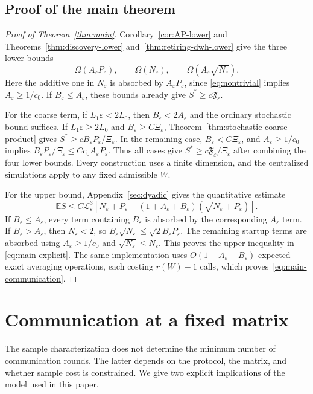 \documentclass[11pt,a4paper]{article}
\newcommand{\E}{\mathbb{E}}
\newcommand{\eps}{\varepsilon}
\theoremstyle{remark}
\begin{document}
\subsection{Proof of the main theorem}
\label{sec:assembly}

\begin{proof}[Proof of Theorem~\ref{thm:main}]
Corollary~\ref{cor:AP-lower} and Theorems~\ref{thm:discovery-lower}
and~\ref{thm:retiring-dwh-lower} give the three lower bounds
\[
 \Omega(A_\eps P_\eps),\qquad \Omega(N_\eps),\qquad
 \Omega(A_\eps\sqrt{N_\eps}).
\]
Here the additive one in $N_\eps$ is absorbed by $A_\eps P_\eps$, since
\eqref{eq:nontrivial} implies $A_\eps\ge1/c_0$.
If $B_\eps\le A_\eps$, these bounds already give
$S^*\ge c\mathfrak F_\eps$.

For the coarse term, if $L_1\eps<2L_0$, then $B_\eps<2A_\eps$ and the
ordinary stochastic bound suffices. If $L_1\eps\ge2L_0$ and
$B_\eps\ge C\Xi_\eps$, Theorem~\ref{thm:stochastic-coarse-product} gives
$S^*\ge cB_\eps P_\eps/\Xi_\eps$. In the remaining case,
$B_\eps<C\Xi_\eps$, and $A_\eps\ge1/c_0$ implies
$B_\eps P_\eps/\Xi_\eps\le Cc_0A_\eps P_\eps$.
Thus all cases give $S^*\ge c\mathfrak F_\eps/\Xi_\eps$ after combining
the four lower bounds. Every construction uses a finite dimension, and the
centralized simulations apply to any fixed admissible $W$.

For the upper bound, Appendix~\ref{sec:dyadic} gives the quantitative estimate
\[
 \E S\le C\mathcal L_\eps^3
 \left[N_\eps+P_\eps+
       (1+A_\eps+B_\eps)(\sqrt{N_\eps}+P_\eps)\right].
\]
If $B_\eps\le A_\eps$, every term containing $B_\eps$ is absorbed by the
corresponding $A_\eps$ term. If $B_\eps>A_\eps$, then $N_\eps<2$, so
$B_\eps\sqrt{N_\eps}\le\sqrt2B_\eps P_\eps$.
The remaining startup terms are absorbed using $A_\eps\ge1/c_0$ and
$\sqrt{N_\eps}\le N_\eps$. This proves the upper inequality in
\eqref{eq:main-explicit}. The same implementation uses
$O(1+A_\eps+B_\eps)$ expected exact averaging operations, each costing
$r(W)-1$ calls, which proves~\eqref{eq:main-communication}.
\end{proof}

\section{Communication at a fixed matrix}
\label{sec:communication}

The sample characterization does not determine the minimum number of
communication rounds. The latter depends on the protocol, the matrix, and
whether sample cost is constrained. We give two explicit implications of
the model used in this paper.
\end{document}
